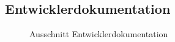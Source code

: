 \subsection{Entwicklerdokumentation}
\label{app:EntwicklerDoku}
\begin{figure}[htb]
\centering
{}
\caption{Ausschnitt Entwicklerdokumentation}
\end{figure}


